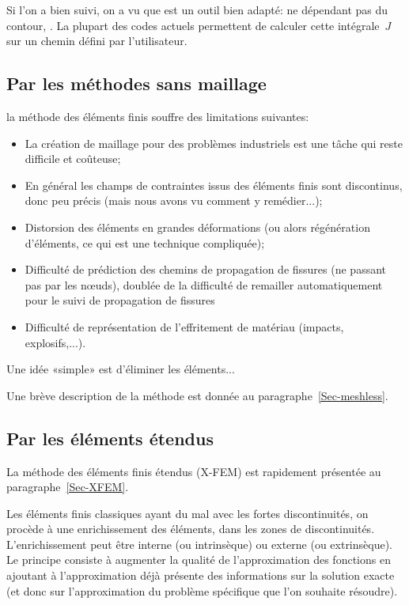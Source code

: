 \medskip
Si l'on a bien suivi, on a vu que  est un outil bien adapté: ne dépendant pas du contour, . La plupart des codes actuels permettent de calculer cette intégrale~$J$ sur un chemin défini par l'utilisateur.



\medskip
\subsection{Par les méthodes sans maillage}

la méthode des éléments finis souffre des limitations suivantes:
\begin{itemize}
  \item La création de maillage pour des problèmes industriels est une tâche qui reste
	difficile et coûteuse;
  \item En général les champs de contraintes issus des éléments finis sont discontinus, donc peu précis (mais nous avons vu comment y remédier...);
  \item Distorsion des éléments en grandes déformations (ou alors régénération
	d'éléments, ce qui est une technique compliquée);
  \item Difficulté de prédiction des chemins de propagation de fissures (ne passant pas par les nœuds), doublée de la difficulté de remailler automatiquement pour le suivi de propagation de fissures
  \item Difficulté de représentation de l'effritement de matériau (impacts, explosifs,...).
\end{itemize}
Une idée «simple» est d'éliminer les éléments...

\medskip
Une brève description de la méthode est donnée au paragraphe~\ref{Sec-meshless}.


\medskip
\subsection{Par les éléments étendus}

La méthode des éléments finis étendus (X-FEM) est rapidement présentée au paragraphe~\ref{Sec-XFEM}.

\medskip
Les éléments finis classiques ayant du mal avec les fortes discontinuités, on procède à une enrichissement des éléments, dans les zones de discontinuités. L'enrichissement peut être interne (ou intrinsèque) ou externe (ou extrinsèque). Le principe consiste à augmenter la qualité de l'approximation des fonctions en ajoutant à l'approximation déjà présente des informations sur la solution exacte (et donc sur l'approximation du problème spécifique que l'on souhaite résoudre).



